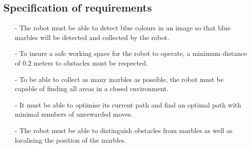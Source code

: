 \documentclass[../Head/Main.tex]{subfiles}
\begin{document}
\subsection{Specification of requirements}

\begin{itemize}

\item[-] The robot must be able to detect blue colours in an image so that blue marbles will be detected and collected by the robot.
\item[-] To insure a safe working space for the robot to operate, a minimum distance of 0.2 meters to obstacles must be respected.
\item[-] To be able to collect as many marbles as possible, the robot must be capable of finding all areas in a closed environment. 
\item[-] It must be able to optimise its current path and find an optimal path with minimal numbers of unrewarded moves.  
\item[-] The robot must be able to distinguish obstacles from marbles as well as localising the position of the marbles.      

\end{itemize}
\end{document}
